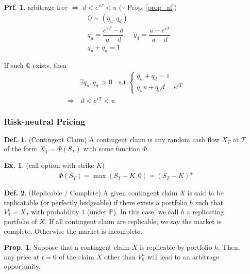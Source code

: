 \documentclass[a4paper,11pt]{jsarticle}
\theoremstyle{definition}
\newtheorem{definition}{Def.}[subsection]
\newtheorem{prf}{Prf.}[subsection]
\newtheorem{prop}{Prop.}[subsection]
\newtheorem{ex}{Ex.}[subsection]
\newcommand{\df}[2]{\dfrac{#1}{#2}}
\begin{document}
\begin{prf}
  arbitrage free $\Leftrightarrow$ $d<e^{rT}<u$
  ($\because$ Prop. \ref{prop_af}) \\
  \begin{align}
    &\mathbb{Q}=(q_u,q_d) \\
    &q_u=\df{e^{rT}-d}{u-d} , \quad
    q_d=\df{u-e^{rT}}{u-d} \\
    &q_u+q_d=1
  \end{align}

  If such $\mathbb{Q}$ exists, then
  \begin{align}
    & \exists q_u,q_d \, >0 \quad \mbox{s.t.}
    \begin{cases}
      q_u+q_d=1 \\
      q_u u + q_d d =e^{rT}
    \end{cases} \\
    \Rightarrow & \, d<e^{rT}<u
  \end{align}
\end{prf}

\subsubsection{Risk-neutral Pricing}
\begin{definition}{(Contingent Claim)}
  A contingent claim is any random cash flow $X_T$ at $T$
  of the form $X_T=\Phi(S_T)$ with some function $\Phi$.

  \begin{ex}{(call option with strike $K$)}
    \begin{align}
      \Phi(S_T)=\max(S_T-K,0)=(S_T-K)^{+}
    \end{align}
  \end{ex}
\end{definition}

\begin{definition}{(Replicable / Complete)}
  A given contingent claim $X$ is said to be replicatable
  (or perfectly hedgeable) if there exists a portfolio $h$
  such that $V_T^h=X_T$ with probability $1$ (under $\mathbb{P}$).
  In this case, we call $h$ a replicating portfolio of $X$.
  If all contingent claim are replicable, we say
  the market is complete. Otherwise the market is incomplete.
\end{definition}

\begin{prop}
  Suppose that a contingent claim $X$ is replicable by
  portfolio $h$. Then, any price at $t=0$ of the claim $X$
  other than $V_0^h$ will lead to an arbitrage opportunity.
\end{prop}
\end{document}
